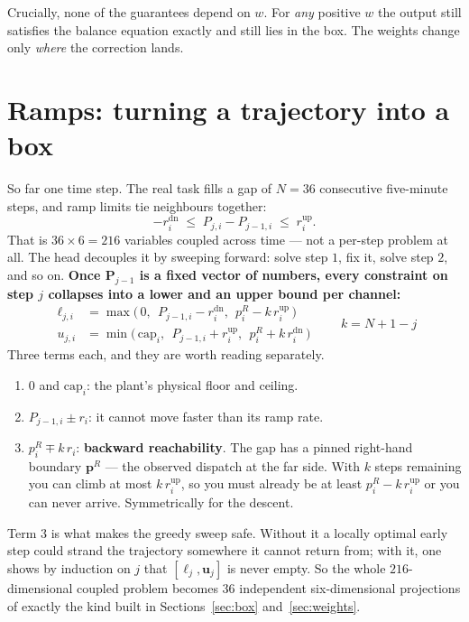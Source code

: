 \documentclass[11pt]{article}
\newcommand{\Pv}{\mathbf{P}}
\newcommand{\lo}{\bm{\ell}}
\newcommand{\hi}{\mathbf{u}}
\begin{document}
Crucially, none of the guarantees depend on $w$. For \emph{any} positive $w$ the
output still satisfies the balance equation exactly and still lies in the box.
The weights change only \emph{where} the correction lands.

\section{Ramps: turning a trajectory into a box}
\label{sec:ramp}

So far one time step. The real task fills a gap of $N = 36$ consecutive
five-minute steps, and ramp limits tie neighbours together:
\[
  -r^{\mathrm{dn}}_i \;\le\; P_{j,i} - P_{j-1,i} \;\le\; r^{\mathrm{up}}_i .
\]
That is $36 \times 6 = 216$ variables coupled across time --- not a
per-step problem at all. The head decouples it by sweeping forward: solve step
$1$, fix it, solve step $2$, and so on. \textbf{Once $\Pv_{j-1}$ is a fixed
vector of numbers, every constraint on step $j$ collapses into a lower and an
upper bound per channel:}
\[
\boxed{
\begin{aligned}
  \ell_{j,i} &= \max\bigl(\,0,\ \ P_{j-1,i} - r^{\mathrm{dn}}_i,\ \
                   p^R_i - k\,r^{\mathrm{up}}_i \,\bigr)\\[2pt]
  u_{j,i}    &= \min\bigl(\,\mathrm{cap}_i,\ \ P_{j-1,i} + r^{\mathrm{up}}_i,\ \
                   p^R_i + k\,r^{\mathrm{dn}}_i \,\bigr)
\end{aligned}}
\qquad k = N + 1 - j
\]
Three terms each, and they are worth reading separately.

\begin{enumerate}
\item $0$ and $\mathrm{cap}_i$: the plant's physical floor and ceiling.
\item $P_{j-1,i} \pm r_i$: it cannot move faster than its ramp rate.
\item $p^R_i \mp k\,r_i$: \textbf{backward reachability}. The gap has a pinned
      right-hand boundary $\mathbf{p}^R$ --- the observed dispatch at the far
      side. With $k$ steps remaining you can climb at most $k\,r^{\mathrm{up}}_i$,
      so you must already be at least $p^R_i - k\,r^{\mathrm{up}}_i$ or you can
      never arrive. Symmetrically for the descent.
\end{enumerate}

Term 3 is what makes the greedy sweep safe. Without it a locally optimal early
step could strand the trajectory somewhere it cannot return from; with it, one
shows by induction on $j$ that $[\lo_j, \hi_j]$ is never empty. So the whole
$216$-dimensional coupled problem becomes $36$ independent six-dimensional
projections of exactly the kind built in Sections~\ref{sec:box}
and~\ref{sec:weights}.
\end{document}
